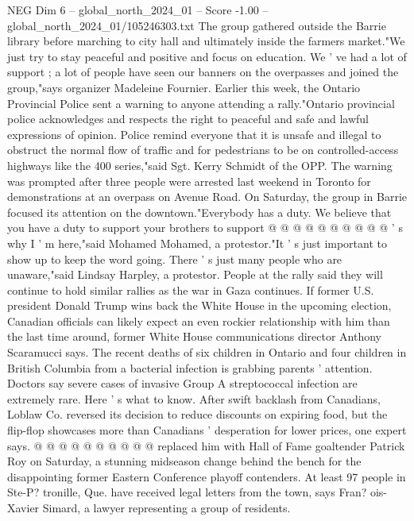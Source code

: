 \begin{textsample}{NEG Dim 6 – global\_north\_2024\_01 – Score -1.00 – global\_north\_2024\_01/105246303.txt}  \label{ex:f6_neg_359}
The group gathered outside the Barrie library before marching to city hall and ultimately inside the farmers market."We just try to stay peaceful and positive and focus on education.
We ' ve had a lot of support ; a lot of people have seen our banners on the overpasses and joined the group,"says organizer Madeleine Fournier.
Earlier this week, the Ontario Provincial Police sent a warning to anyone attending a rally."Ontario provincial police acknowledges and respects the right to peaceful and safe and lawful expressions of opinion.
Police remind everyone that it is unsafe and illegal to obstruct the normal flow of traffic and for pedestrians to be on controlled-access highways like the 400 series,"said Sgt.
Kerry Schmidt of the OPP.
The warning was prompted after three people were arrested last weekend in Toronto for demonstrations at an overpass on Avenue Road.
On Saturday, the group in Barrie focused its attention on the downtown."Everybody has a duty.
We believe that you have a duty to support your brothers to support @ @ @ @ @ @ @ @ @ @ ' s why I ' m here,"said Mohamed Mohamed, a protestor."It ' s just important to show up to keep the word going.
There ' s just many people who are unaware,"said Lindsay Harpley, a protestor.
People at the rally said they will continue to hold similar rallies as the war in Gaza continues.
If former U.S. president Donald Trump wins back the White House in the upcoming election, Canadian officials can likely expect an even rockier relationship with him than the last time around, former White House communications director Anthony Scaramucci says.
The recent deaths of six children in Ontario and four children in British Columbia from a bacterial infection is grabbing parents ' attention.
Doctors say severe cases of invasive Group A streptococcal infection are extremely rare.
Here ' s what to know.
After swift backlash from Canadians, Loblaw Co. reversed its decision to reduce discounts on expiring food, but the flip-flop showcases more than Canadians ' desperation for lower prices, one expert says. @ @ @ @ @ @ @ @ @ @ replaced him with Hall of Fame goaltender Patrick Roy on Saturday, a stunning midseason change behind the bench for the disappointing former Eastern Conference playoff contenders.
At least 97 people in Ste-P? tronille, Que. have received legal letters from the town, says Fran? ois-Xavier Simard, a lawyer representing a group of residents.

\end{textsample}
